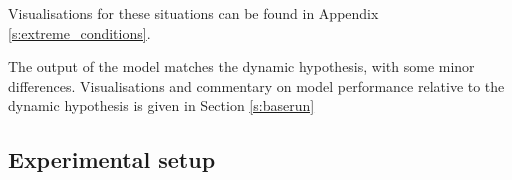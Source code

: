 
Visualisations for these situations can be found in Appendix \ref{s:extreme_conditions}.
    
The output of the model matches the dynamic hypothesis, with some minor differences. Visualisations and commentary on model performance relative to the dynamic hypothesis is given in Section \ref{s:baserun}
    
\subsection{Experimental setup}
  
